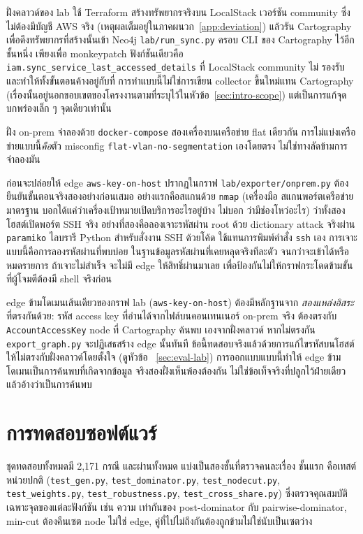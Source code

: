 ฝั่งคลาวด์ของ lab ใช้ Terraform สร้างทรัพยากรจริงบน LocalStack เวอร์ชัน community
ซึ่งไม่ต้องมีบัญชี AWS จริง (เหตุผลเต็มอยู่ในภาคผนวก~\ref{app:deviation}) แล้วรัน
Cartography เพื่อดึงทรัพยากรที่สร้างนั้นเข้า Neo4j \texttt{lab/run\_sync.py} ครอบ CLI
ของ Cartography ไว้อีกชั้นหนึ่ง เพียงเพื่อ monkeypatch ฟังก์ชันเดียวคือ
\texttt{iam.sync\_service\_last\_accessed\_details} ที่ LocalStack community ไม่
รองรับและทำให้ทั้งขั้นตอนค้างอยู่กับที่ การทำแบบนี้ไม่ใช่การเขียน collector ขึ้นใหม่แทน
Cartography (เรื่องนั้นอยู่นอกขอบเขตของโครงงานตามที่ระบุไว้ในหัวข้อ~\ref{sec:intro-scope})
แต่เป็นการแก้จุดบกพร่องเล็ก ๆ จุดเดียวเท่านั้น

ฝั่ง on-prem จำลองด้วย \texttt{docker-compose} สองเครื่องบนเครือข่าย flat เดียวกัน
การไม่แบ่งเครือข่ายแบบนี้\emph{คือ}ตัว misconfig \texttt{flat-vlan-no-segmentation}
เองโดยตรง ไม่ใช่ทางลัดข้ามการจำลองมัน

ก่อนจะปล่อยให้ edge \texttt{aws-key-on-host} ปรากฏในกราฟ \texttt{lab/exporter/onprem.py}
ต้องยืนยันขั้นตอนจริงสองอย่างก่อนเสมอ อย่างแรกคือสแกนด้วย \texttt{nmap} (เครื่องมือ
สแกนพอร์ตเครือข่ายมาตรฐาน บอกได้แค่ว่าเครื่องเป้าหมายเปิดบริการอะไรอยู่บ้าง ไม่บอก
ว่ามีช่องโหว่อะไร) ว่าทั้งสองโฮสต์เปิดพอร์ต SSH จริง อย่างที่สองคือลองเจาะรหัสผ่าน root
ด้วย dictionary attack จริงผ่าน \texttt{paramiko} ไลบรารี Python สำหรับสั่งงาน SSH
ด้วยโค้ด ใช้แทนการพิมพ์คำสั่ง \texttt{ssh} เอง การเจาะแบบนี้คือการลองรหัสผ่านที่พบบ่อย
ในฐานข้อมูลรหัสผ่านที่เคยหลุดจริงทีละตัว จนกว่าจะเข้าได้หรือหมดรายการ ถ้าเจาะไม่สำเร็จ
จะไม่มี edge ให้สิทธิ์ผ่านมาเลย เพื่อป้องกันไม่ให้กราฟกระโดดข้ามขั้นที่ผู้โจมตีต้องมี shell
จริงก่อน

edge ข้ามโดเมนเส้นเดียวของกราฟ lab (\texttt{aws-key-on-host}) ต้องมีหลักฐานจาก
\emph{สองแหล่งอิสระ}ที่ตรงกันด้วย: รหัส access key ที่อ่านได้จากไฟล์บนคอนเทนเนอร์
on-prem จริง ต้องตรงกับ \texttt{AccountAccessKey} node ที่ Cartography ค้นพบ
เองจากฝั่งคลาวด์ หากไม่ตรงกัน \texttt{export\_graph.py} จะปฏิเสธสร้าง edge นั้นทันที
ข้อนี้ทดสอบจริงแล้วด้วยการแก้ไขรหัสบนโฮสต์ให้ไม่ตรงกับฝั่งคลาวด์โดยตั้งใจ (ดูหัวข้อ~
\ref{sec:eval-lab}) การออกแบบแบบนี้ทำให้ edge ข้ามโดเมนเป็นการค้นพบที่เกิดจากข้อมูล
จริงสองฝั่งเห็นพ้องต้องกัน ไม่ใช่ข้อเท็จจริงที่ปลูกไว้ฝ่ายเดียวแล้วอ้างว่าเป็นการค้นพบ

\section{การทดสอบซอฟต์แวร์}\label{sec:impl-tests}

ชุดทดสอบทั้งหมดมี 2{,}171 กรณี และผ่านทั้งหมด แบ่งเป็นสองชั้นที่ตรวจคนละเรื่อง ชั้นแรก
คือเทสต์หน่วยปกติ (\texttt{test\_gen.py}, \texttt{test\_dominator.py},
\texttt{test\_nodecut.py}, \texttt{test\_weights.py}, \texttt{test\_robustness.py},
\texttt{test\_cross\_share.py}) ซึ่งตรวจคุณสมบัติเฉพาะจุดของแต่ละฟังก์ชัน เช่น ความ
เท่ากันของ post-dominator กับ pairwise-dominator, min-cut ต้องคืนเซต node ไม่ใช่
edge, คู่ที่ไปไม่ถึงกันต้องถูกข้ามไม่ใช่นับเป็นเซตว่าง

